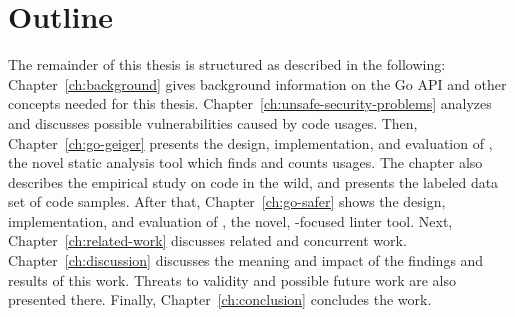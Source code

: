 \section{Outline}\label{sec:introduction:outline}

The remainder of this thesis is structured as described in the following: Chapter~\ref{ch:background} gives background
information on the Go \unsafe{} \acrshort{API} and other concepts needed for this thesis.
Chapter~\ref{ch:unsafe-security-problems} analyzes and discusses possible vulnerabilities caused by \unsafe{} code
usages.
Then, Chapter~\ref{ch:go-geiger} presents the design, implementation, and evaluation of \toolGeiger, the novel static
analysis tool which finds and counts \unsafe{} usages.
The chapter also describes the empirical study on \unsafe{} code in the wild, and presents the labeled data set of
\unsafe{} code samples.
After that, Chapter~\ref{ch:go-safer} shows the design, implementation, and evaluation of \toolSafer, the novel,
\unsafe{}-focused linter tool.
Next, Chapter~\ref{ch:related-work} discusses related and concurrent work.
Chapter~\ref{ch:discussion} discusses the meaning and impact of the findings and results of this work.
Threats to validity and possible future work are also presented there.
Finally, Chapter~\ref{ch:conclusion} concludes the work.
